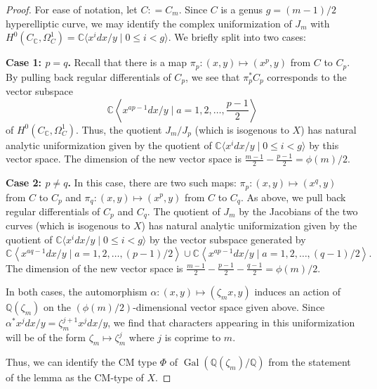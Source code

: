 \documentclass[reqno, oneside, 12pt]{amsart}
\DeclareMathOperator{\Gal}{Gal}
\newcommand{\Q}{\mathbb{Q}}
\newcommand{\C}{\mathbb{C}}
\theoremstyle{remark}
\numberwithin{equation}{section}
\begin{document}
\begin{proof}
For ease of notation, let $C\colon=C_m$. Since $C$ is a genus $g=(m-1)/2$ hyperelliptic curve, we may identify the complex uniformization of $J_m$ with $H^0(C_\C, \Omega_C^1)=\C\langle x^idx/y\mid 0\leq i< g\rangle$. We briefly split into two cases:

\textbf{Case 1: $p=q$.} Recall that there is a map 
 $\pi_p: (x,y)\mapsto (x^{p},y)$ from $C$ to $C_p$.  By pulling back regular differentials of $C_p$, we see that $\pi_p^*C_p$ corresponds to the vector subspace $$\C\left\langle{x^{ap-1}}dx/y\mid a=1, 2, \ldots,\frac{p-1}{2}\right\rangle$$ of $H^0(C_\C, \Omega_C^1)$. 
 Thus, the quotient $J_m/J_p$ (which is isogenous to $X$) has natural analytic uniformization given by the quotient of $\C\langle x^idx/y\mid 0\leq i< g\rangle$ by this vector space. The dimension of the new vector space is $\frac{m-1}{2}-\frac{p-1}{2}=\phi(m)/2$.

\textbf{Case 2: $p\not=q$.} In this case, there are two such maps:  $\pi_p: (x,y)\mapsto (x^{q},y)$ from $C$ to $C_p$ and $\pi_q: (x,y)\mapsto (x^{p},y)$ from $C$ to $C_q$. As above, we pull back regular differentials of $C_p$ and $C_q$. The quotient of $J_m$ by the Jacobians of the two curves (which is isogenous to $X$) has  natural analytic uniformization given by the quotient of
$\C\langle x^idx/y\mid 0\leq i< g\rangle$ by the vector subspace generated by
$$\C\left\langle{x^{aq-1}}dx/y\mid a=1, 2, \ldots,({p-1})/{2}\right\rangle \cup \C\left\langle{x^{ap-1}}dx/y\mid a=1, 2, \ldots,({q-1})/{2}\right\rangle.$$
The dimension of the new vector space is $\frac{m-1}{2}-\frac{p-1}{2}-\frac{q-1}{2}=\phi(m)/2$.

In both cases, the automorphism $\alpha\colon(x,y)\mapsto (\zeta_mx,y)$ induces an action of $\Q(\zeta_m)$ on the $(\phi(m)/2)$-dimensional vector space given above. Since $\alpha^*x^jdx/y=\zeta_m^{j+1} x^jdx/y$, we find that characters appearing in this uniformization will be of the form $\zeta_m\mapsto \zeta_m^j$ where $j$ is coprime to $m$. 

Thus, we can identify the CM type $\Phi$ of $\Gal(\Q(\zeta_m)/\Q)$ from the statement of the lemma as the CM-type of  $X$.
\end{proof}
\end{document}
